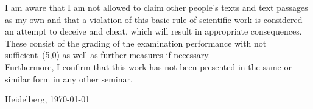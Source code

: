 \documentclass[
     11pt,         %
     a4paper,      %
     oneside,
     ]{article}
\begin{document}
I am aware that I am not allowed to claim other people's texts and text passages as my own and that a violation of this basic rule of scientific work is considered an attempt to deceive and cheat, which will result in appropriate consequences. These consist of
the grading of the examination performance with \glqq not sufficient\grqq\ (5,0) as well as further measures if necessary. \\

Furthermore, I confirm that this work has not been presented in the same or similar form in any other seminar.
\vspace*{50pt}

Heidelberg, \today \hspace{2cm} \underline{\phantom{space for signature}}

\newpage



\tableofcontents
\newpage












\newpage
{}


\end{document}
